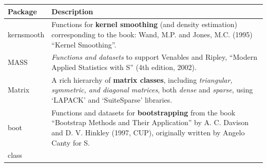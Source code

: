 \documentclass[]{book}
\theoremstyle{definition}
\theoremstyle{definition}
\theoremstyle{definition}
\theoremstyle{remark}
\begin{document}
\begin{longtable}[]{@{}ll@{}}
\toprule
\begin{minipage}[b]{0.16\columnwidth}\raggedright\strut
Package\strut
\end{minipage} & \begin{minipage}[b]{0.73\columnwidth}\raggedright\strut
Description\strut
\end{minipage}\tabularnewline
\midrule
\endhead
\begin{minipage}[t]{0.16\columnwidth}\raggedright\strut
kernsmooth\strut
\end{minipage} & \begin{minipage}[t]{0.73\columnwidth}\raggedright\strut
Functions for \textbf{kernel smoothing} (and density estimation)
corresponding to the book: Wand, M.P. and Jones, M.C. (1995) ``Kernel
Smoothing''.\strut
\end{minipage}\tabularnewline
\begin{minipage}[t]{0.16\columnwidth}\raggedright\strut
MASS\strut
\end{minipage} & \begin{minipage}[t]{0.73\columnwidth}\raggedright\strut
\emph{Functions and datasets} to support Venables and Ripley, ``Modern
Applied Statistics with S'' (4th edition, 2002).\strut
\end{minipage}\tabularnewline
\begin{minipage}[t]{0.16\columnwidth}\raggedright\strut
Matrix\strut
\end{minipage} & \begin{minipage}[t]{0.73\columnwidth}\raggedright\strut
A rich hierarchy of \textbf{matrix classes}, including \emph{triangular,
symmetric, and diagonal matrices}, both \emph{dense} and \emph{sparse},
using `LAPACK' and `SuiteSparse' libraries.\strut
\end{minipage}\tabularnewline
\begin{minipage}[t]{0.16\columnwidth}\raggedright\strut
boot\strut
\end{minipage} & \begin{minipage}[t]{0.73\columnwidth}\raggedright\strut
Functions and datasets for \textbf{bootstrapping} from the book
``Bootstrap Methods and Their Application'' by A. C. Davison and D. V.
Hinkley (1997, CUP), originally written by Angelo Canty for S.\strut
\end{minipage}\tabularnewline
\begin{minipage}[t]{0.16\columnwidth}\raggedright\strut
class\strut
\end{minipage} & \begin{minipage}[t]{0.73\columnwidth}\raggedright\strut

\end{minipage}
\end{longtable}
\end{document}
